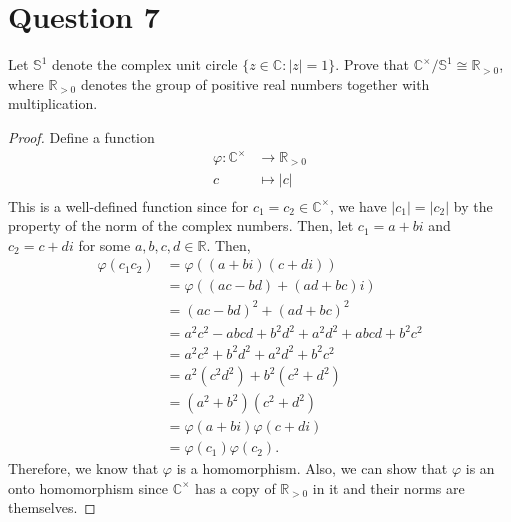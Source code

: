 \section{Question 7}

\begin{question}
    Let $\mathbb{S}^1$ denote the complex unit circle $\{z \in \mathbb{C}:|z|=1\}$. Prove that $\mathbb{C}^{\times} / \mathbb{S}^1 \cong \mathbb{R}_{>0}$, where $\mathbb{R}_{>0}$ denotes the group of positive real numbers together with multiplication.
\end{question}

\begin{answer}
    \begin{proof}
        Define a function
        \begin{equation}
            \begin{aligned}
                \varphi: \mathbb{C}^{\times} &\to \mathbb{R}_{>0}\\
                c &\mapsto \lvert c \rvert\\
            \end{aligned}
        \end{equation}
        This is a well-defined function since for $c_1=c_2 \in \mathbb{C}^{\times}$, we have $\lvert c_1 \rvert = \lvert c_2 \rvert$ by the property of the norm of the complex numbers. Then, let $c_1 = a + bi$ and $c_2 = c + di$ for some $a,b,c,d \in \mathbb{R}$. Then,
        \begin{equation}
            \begin{aligned}
                \varphi(c_1c_2) &= \varphi((a+bi)(c+di))\\
                &= \varphi((ac-bd)+(ad+bc)i)\\
                &= (ac-bd)^2+(ad+bc)^2\\
                &= a^2c^2 - abcd + b^2d^2 + a^2d^2 + abcd +b^2c^2\\
                &= a^2c^2 + b^2d^2 + a^2d^2 +b^2c^2\\
                &= a^2(c^2d^2) + b^2(c^2+d^2)\\
                &= (a^2+b^2)(c^2+d^2)\\
                &= \varphi(a+bi)\varphi(c+di)\\
                &= \varphi(c_1)\varphi(c_2).
            \end{aligned}
        \end{equation}
        Therefore, we know that $\varphi$ is a homomorphism. Also, we can show that $\varphi$ is an onto homomorphism since $\mathbb{C}^{\times}$ has a copy of $\mathbb{R}_{>0}$ in it and their norms are themselves.
        

\end{proof}
\end{answer}
